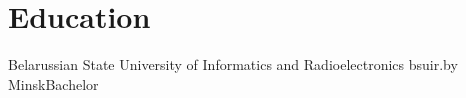 \section{Education}
{Belarussian State University of Informatics and Radioelectronics bsuir.by}
{Minsk}{Bachelor}{}


